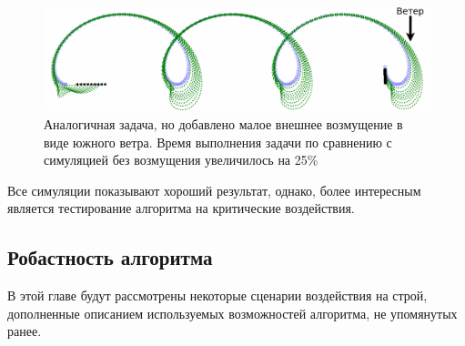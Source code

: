 \documentclass[a4paper, 14pt]{extarticle}
\let\Oldsubsection\subsection
\renewcommand{\subsection}{\FloatBarrier\Oldsubsection}
\begin{document}
\begin{figure}
	\centering
	\includegraphics[width=1\linewidth]{platoon/line-platoon-winded-cropped-txt}
	\caption{Аналогичная задача, но добавлено малое внешнее возмущение в виде южного ветра. Время выполнения задачи по сравнению с симуляцией без возмущения увеличилось на 25\%}
	\label{fig:line-platoon-winded}
\end{figure}






Все симуляции показывают хороший результат, однако, более интересным является тестирование алгоритма на критические воздействия.
\subsection{Робастность алгоритма}
В этой главе будут рассмотрены некоторые сценарии воздействия на строй, дополненные описанием используемых возможностей алгоритма, не упомянутых ранее.
\end{document}
